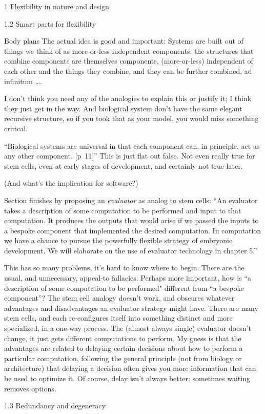 \documentclass[12pt]{PalisadesLakesBook}
\begin{document}
\begin{plSection}{1 Flexibility in nature and design}
\begin{plSection}{1.2 Smart parts for flexibility}
\begin{plSection}{Body plans}
The actual idea is good and important:
Systems are built out of things we think of as more-or-less
independent components;
the structures that combine components 
are themselves components,
(more-or-less) independent of each other 
and the things they combine,
and they can be further combined, ad infinitum {\ldots}.

I don't think you need any of the analogies to explain this
or justify it; I think they just get in the way.
And biological system don't have the same elegant recursive
structure, so if you took that as your model, 
you would miss something critical.

``Biological systems are universal in that each component can,
in principle, act as any other component. [p~11]''
This is just flat out false. 
Not even really true for stem cells, 
even at early stages of development,
and certainly not true later.

(And what's the implication for software?)

Section finishes by proposing an \emph{evaluator} as 
analog to stem cells:
``An evaluator takes a description of some computation
to be performed and input to that computation.
It produces the outputs that would arise if we passed the inputs
to a bespoke component that implemented the desired computation.
In computation we have a chance to pursue the powerfully
flexible strategy of embryonic development.
We will elaborate on the use of evaluator technology in chapter 5.''

This has so many problems, it's hard to know where to begin.
There are the usual, and unnecessary, appeal-to fallacies.
Perhaps more important, how is 
``a description of some computation to be performed"
different from 
``a bespoke component''? 
The stem cell analogy doesn't work, and obscures whatever
advantages and disadvantages an evaluator strategy might have.
There are many stem cells,
and each re-configures itself
into something distinct and more specialized, 
in a one-way process.
The (almost always single) evaluator doesn't change, 
it just gets different computations to perform.
My guess is that the advantages are related to delaying
certain decisions about how to perform a particular computation,
following the general principle (not from biology or architecture)
that delaying a decision often gives you 
more information that can be used to optimize it.
Of course, delay isn't always better; 
sometimes waiting removes options.

\end{plSection}%
\end{plSection}%
\begin{plSection}{1.3 Redundancy and degeneracy}


\end{plSection}
\end{plSection}
\end{document}
